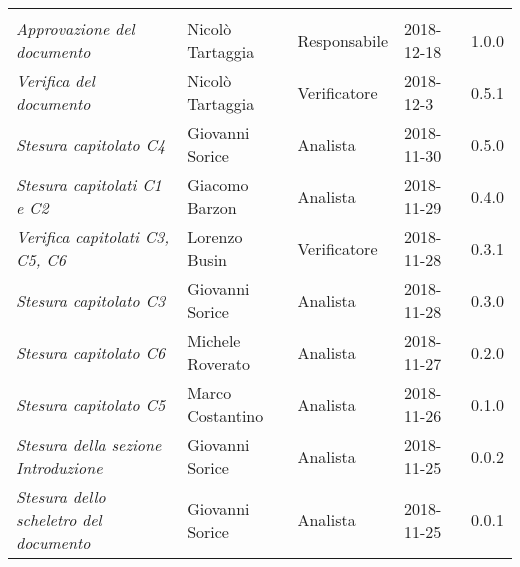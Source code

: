 \newpage 
\section*{}
\begin{table}[H]
	\centering
	\begin{tabular}{p{4cm}|C{3cm}|C{3cm}|R{2.5cm}|R{2cm}}
		
		 & & & & \\
		
		
		\emph{Approvazione del documento} & Nicolò Tartaggia & Responsabile & 2018-12-18 & 1.0.0 \\
		\hline
		
		\emph{Verifica del documento} & Nicolò Tartaggia & Verificatore & 2018-12-3 & 0.5.1 \\
		\hline
		
		\emph{Stesura capitolato C4 } & Giovanni Sorice & Analista & 2018-11-30 & 0.5.0 \\
		\hline
		
		\emph{Stesura capitolati C1 e C2} & Giacomo Barzon & Analista & 2018-11-29 & 0.4.0 \\
		\hline
		
		\emph{Verifica capitolati C3, C5, C6} & Lorenzo Busin & Verificatore & 2018-11-28 & 0.3.1 \\
		\hline
		
		\emph{Stesura capitolato C3 } & Giovanni Sorice & Analista & 2018-11-28 & 0.3.0 \\
		\hline
		
		\emph{Stesura capitolato C6 } & Michele Roverato & Analista & 2018-11-27 & 0.2.0 \\
		\hline
		
		\emph{Stesura capitolato C5 } & Marco Costantino & Analista & 2018-11-26 & 0.1.0 \\
		\hline
		
		\emph{Stesura della sezione Introduzione } & Giovanni Sorice & Analista & 2018-11-25 & 0.0.2 \\
		\hline
		
		\emph{Stesura dello scheletro del documento} & Giovanni Sorice & Analista & 2018-11-25 & 0.0.1 \\
		
	\end{tabular}
	
\end{table}


\clearpage